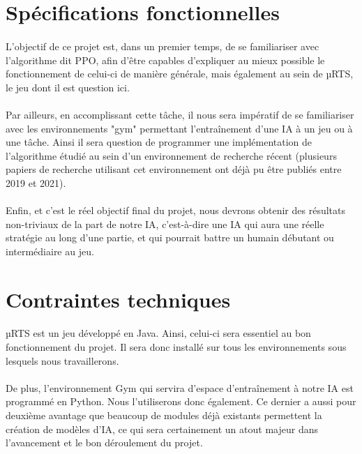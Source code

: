 \documentclass[french]{article}
\begin{document}
	\section{Spécifications fonctionnelles}
	\paragraph*{}
	L'objectif de ce projet est, dans un premier temps, de se familiariser avec l'algorithme dit PPO, afin d'être capables d'expliquer au mieux possible le fonctionnement de celui-ci de manière générale, mais également au sein de µRTS, le jeu dont il est question ici.
	
	\paragraph*{}
	Par ailleurs, en accomplissant cette tâche, il nous sera impératif de se familiariser avec les environnements "gym" permettant l'entraînement d'une IA à un jeu ou à une tâche. Ainsi il sera question de programmer une implémentation de l'algorithme étudié au sein d'un environnement de recherche récent (plusieurs papiers de recherche \scount utilisant cet environnement ont déjà pu être publiés entre 2019 et 2021).
	
	\paragraph*{}
	Enfin, et c'est le réel objectif final du projet, nous devrons obtenir des résultats non-triviaux de la part de notre IA, c'est-à-dire une IA qui aura une réelle stratégie au long d'une partie, et qui pourrait battre un humain débutant ou intermédiaire au jeu.
	
	
	\section{Contraintes techniques}
	\paragraph*{}
	µRTS est un jeu développé en Java. Ainsi, celui-ci sera essentiel au bon fonctionnement du projet. Il sera donc installé sur tous les environnements sous lesquels nous travaillerons.
	
	\paragraph*{}
	De plus, l'environnement Gym qui servira d'espace d'entraînement à notre IA est programmé en Python. Nous l'utiliserons donc également. Ce dernier a aussi pour deuxième avantage que beaucoup de modules déjà existants permettent la création de modèles d'IA, ce qui sera certainement un atout majeur dans l'avancement et le bon déroulement du projet.
	
\end{document}
